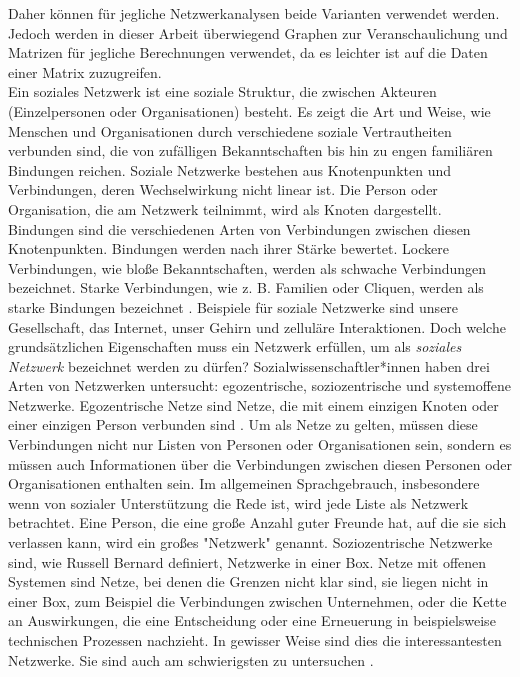 Daher können für jegliche Netzwerkanalysen beide Varianten verwendet werden. Jedoch werden in dieser Arbeit überwiegend Graphen zur Veranschaulichung und Matrizen für jegliche Berechnungen verwendet, da es leichter ist auf die Daten einer Matrix zuzugreifen.\\

Ein soziales Netzwerk ist eine soziale Struktur, die zwischen Akteuren (Einzelpersonen oder Organisationen) besteht. Es zeigt die Art und Weise, wie Menschen und Organisationen durch verschiedene soziale Vertrautheiten verbunden sind, die von zufälligen Bekanntschaften bis hin zu engen familiären Bindungen reichen. Soziale Netzwerke bestehen aus Knotenpunkten und Verbindungen, deren Wechselwirkung nicht linear ist. Die Person oder Organisation, die am Netzwerk teilnimmt, wird als Knoten dargestellt. Bindungen sind die verschiedenen Arten von Verbindungen zwischen diesen Knotenpunkten. Bindungen werden nach ihrer Stärke bewertet. Lockere Verbindungen, wie bloße Bekanntschaften, werden als schwache Verbindungen bezeichnet. Starke Verbindungen, wie z. B. Familien oder Cliquen, werden als starke Bindungen bezeichnet \cite{SNADefinition}. Beispiele für soziale Netzwerke sind unsere Gesellschaft, das Internet, unser Gehirn und zelluläre Interaktionen.
Doch welche grundsätzlichen Eigenschaften muss ein Netzwerk erfüllen, um als \textit{soziales Netzwerk} bezeichnet werden zu dürfen? 
Sozialwissenschaftler*innen haben drei Arten von Netzwerken untersucht: egozentrische, soziozentrische und systemoffene
Netzwerke. Egozentrische Netze sind Netze, die mit einem einzigen Knoten oder einer einzigen Person verbunden sind \cite{egocentric}. Um als Netze zu gelten, müssen diese Verbindungen nicht nur Listen von Personen oder Organisationen sein, sondern es müssen auch Informationen über die Verbindungen zwischen diesen Personen oder Organisationen enthalten sein. Im allgemeinen Sprachgebrauch, insbesondere wenn von sozialer Unterstützung die Rede ist, wird jede Liste als Netzwerk betrachtet. Eine Person, die eine große Anzahl guter Freunde hat, auf die sie sich verlassen kann, wird ein großes "Netzwerk" genannt. Soziozentrische Netzwerke sind, wie Russell Bernard definiert, Netzwerke in einer Box. Netze mit offenen Systemen sind Netze, bei denen die Grenzen nicht klar sind, sie liegen nicht in einer Box, zum Beispiel die Verbindungen zwischen Unternehmen, oder die Kette an Auswirkungen, die eine Entscheidung oder eine Erneuerung in beispielsweise technischen Prozessen nachzieht. In gewisser Weise sind dies die interessantesten Netzwerke. Sie sind auch am schwierigsten zu untersuchen \cite{charlesKadushin}. 




